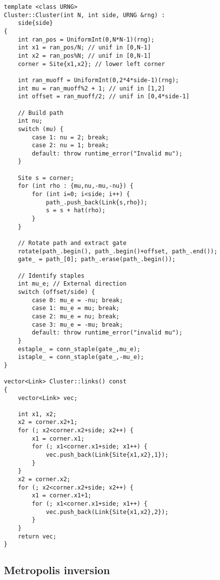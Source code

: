 \begin{lstlisting}[caption={Cluster class implementation}]
template <class URNG>
Cluster::Cluster(int N, int side, URNG &rng) :
    side{side}
{
    int ran_pos = UniformInt(0,N*N-1)(rng);
    int x1 = ran_pos/N; // unif in [0,N-1]
    int x2 = ran_pos%N; // unif in [0,N-1]
    corner = Site{x1,x2}; // lower left corner

    int ran_muoff = UniformInt(0,2*4*side-1)(rng);
    int mu = ran_muoff%2 + 1; // unif in [1,2]
    int offset = ran_muoff/2; // unif in [0,4*side-1]

    // Build path
    int nu;
    switch (mu) {
        case 1: nu = 2; break;
        case 2: nu = 1; break;
        default: throw runtime_error("Invalid mu");
    }

    Site s = corner;
    for (int rho : {mu,nu,-mu,-nu}) {
        for (int i=0; i<side; i++) {
            path_.push_back(Link{s,rho});
            s = s + hat(rho);
        }
    }

    // Rotate path and extract gate
    rotate(path_.begin(), path_.begin()+offset, path_.end());
    gate_ = path_[0]; path_.erase(path_.begin());
    
    // Identify staples
    int mu_e; // External direction
    switch (offset/side) {
        case 0: mu_e = -nu; break;
        case 1: mu_e = mu; break;
        case 2: mu_e = nu; break;
        case 3: mu_e = -mu; break;
        default: throw runtime_error("invalid mu");
    }
    estaple_ = conn_staple(gate_,mu_e);
    istaple_ = conn_staple(gate_,-mu_e);
}

vector<Link> Cluster::links() const
{
    vector<Link> vec;

    int x1, x2;
    x2 = corner.x2+1;
    for (; x2<corner.x2+side; x2++) {
        x1 = corner.x1;
        for (; x1<corner.x1+side; x1++) {
            vec.push_back(Link{Site{x1,x2},1});
        }
    }
    x2 = corner.x2;
    for (; x2<corner.x2+side; x2++) {
        x1 = corner.x1+1;
        for (; x1<corner.x1+side; x1++) {
            vec.push_back(Link{Site{x1,x2},2});
        }
    }
    return vec;
}
\end{lstlisting}

\subsection*{Metropolis inversion}

